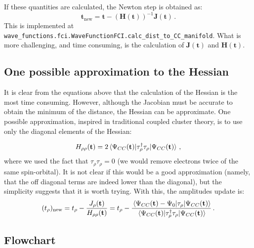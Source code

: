 If these quantities are calculated, the Newton step is obtained as:
\begin{equation}\label{eq:cc_minD_update}
  \mathbf{t}_\text{new} =
  \mathbf{t} - \left(\mathbf{H}(\mathbf{t})\right)^{-1}\mathbf{J}(\mathbf{t})\,.
\end{equation}
This is implemented at \texttt{wave\_functions.fci.WaveFunctionFCI.calc\_dist\_to\_CC\_manifold}.
What is more challenging, and time consuming, is the calculation of $\mathbf{J}(\mathbf{t})$ and
$\mathbf{H}(\mathbf{t})$.

\subsection{One possible approximation to the Hessian}
\label{sec:cc_man_appr_hess}

It is clear from the equations above that the calculation of the Hessian is the most time consuming.
However, although the Jacobian must be accurate to obtain the minimum of the distance,
the Hessian can be approximate.
One possible approximation, inspired in traditional coupled cluster theory,
is to use only the diagonal elements of the Hessian:

\begin{equation}\label{eq:cc_minD_hess_diag}
  \begin{split}
    H_{\rho\rho}(\mathbf{t}) =
    2\mel{\Psi_{CC}(\mathbf{t})}{\tau_\rho^\dagger\tau_\rho}{\Psi_{CC}(\mathbf{t})}\,,
  \end{split}
\end{equation}
where we used the fact that $\tau_\rho\tau_\rho = 0$
(we would remove electrons twice of the same spin-orbital).
It is not clear if this would be a good approximation
(namely, that the off diagonal terms are indeed lower than the diagonal),
but the simplicity suggests that it is worth trying.
With this, the amplitudes update is:
\begin{equation}\label{eq:cc_minD_update}
  (t_\rho)_\text{new}
  = t_\rho - \frac{J_\rho(\mathbf{t})}{H_{\rho\rho}(\mathbf{t})}
  = t_\rho
  - \frac{\mel{\Psi_{CC}(\mathbf{t}) - \Psi_0}{\tau_\rho}{\Psi_{CC}(\mathbf{t})}}
  {\mel{\Psi_{CC}(\mathbf{t})}{\tau_\rho^\dagger\tau_\rho}{\Psi_{CC}(\mathbf{t})}}\,.
\end{equation}



\newpage
\subsection{Flowchart}



